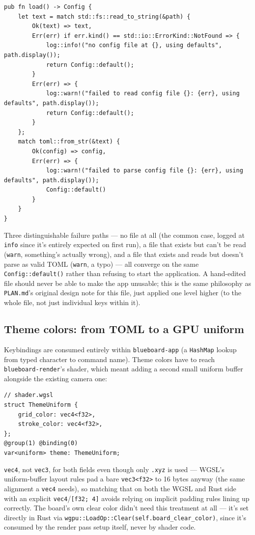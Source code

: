 \documentclass[11pt]{article}
\begin{document}
\begin{lstlisting}
pub fn load() -> Config {
    let text = match std::fs::read_to_string(&path) {
        Ok(text) => text,
        Err(err) if err.kind() == std::io::ErrorKind::NotFound => {
            log::info!("no config file at {}, using defaults", path.display());
            return Config::default();
        }
        Err(err) => {
            log::warn!("failed to read config file {}: {err}, using defaults", path.display());
            return Config::default();
        }
    };
    match toml::from_str(&text) {
        Ok(config) => config,
        Err(err) => {
            log::warn!("failed to parse config file {}: {err}, using defaults", path.display());
            Config::default()
        }
    }
}
\end{lstlisting}
Three distinguishable failure paths — no file at all (the common case, logged at
\texttt{info} since it's entirely expected on first run), a file that exists but can't be
read (\texttt{warn}, something's actually wrong), and a file that exists and reads but
doesn't parse as valid TOML (\texttt{warn}, a typo) — all converge on the same
\texttt{Config::default()} rather than refusing to start the application. A hand-edited
file should never be able to make the app unusable; this is the same philosophy as
\texttt{PLAN.md}'s original design note for this file, just applied one level higher (to
the whole file, not just individual keys within it).

\subsection{Theme colors: from TOML to a GPU uniform}
Keybindings are consumed entirely within \texttt{blueboard-app} (a
\texttt{HashMap} lookup from typed character to command name). Theme colors have to reach
\texttt{blueboard-render}'s shader, which meant adding a second small uniform buffer
alongside the existing camera one:
\begin{lstlisting}
// shader.wgsl
struct ThemeUniform {
    grid_color: vec4<f32>,
    stroke_color: vec4<f32>,
};
@group(1) @binding(0)
var<uniform> theme: ThemeUniform;
\end{lstlisting}
\texttt{vec4}, not \texttt{vec3}, for both fields even though only \texttt{.xyz} is used —
WGSL's uniform-buffer layout rules pad a bare \texttt{vec3<f32>} to 16 bytes anyway (the
same alignment a \texttt{vec4} needs), so matching that on both the WGSL and Rust side with
an explicit \texttt{vec4}/\texttt{[f32; 4]} avoids relying on implicit padding rules lining
up correctly. The board's own clear color didn't need this treatment at all — it's set
directly in Rust via \texttt{wgpu::LoadOp::Clear(self.board\_clear\_color)}, since it's
consumed by the render pass setup itself, never by shader code.
\end{document}
